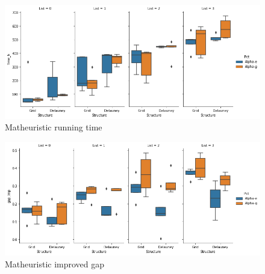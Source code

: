 \documentclass[slidestop,usepdftitle=false,10pt]{beamer}
\begin{document}
	\begin{frame}
	    \begin{figure}
	        \centering
            \includegraphics[width=1\linewidth]{time_h.png}
            \caption{Matheuristic running time}
            \label{fig:1}
	    \end{figure}
	\end{frame}
	\begin{frame}
	    \begin{figure}
    	    \centering
            \includegraphics[width=1\linewidth]{improved_gap.png}
            \caption{Matheuristic improved gap}
	    \end{figure}
	\end{frame}
	
\end{document}
